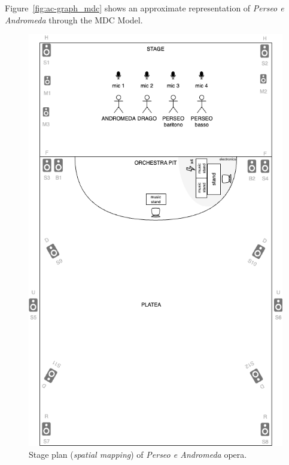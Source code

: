 Figure~\ref{fig:ac-graph_mdc} shows an approximate representation of \textit{Perseo e Andromeda} through the MDC Model.


\begin{figure}
    \centering
    \includegraphics[width=\linewidth]{chapters/appendix/c/image/graphc-mapping-spatial.png}
    \caption{Stage plan (\textit{spatial mapping}) of \textit{Perseo e Andromeda} opera.}
    \label{fig:ac-mapping-spatial}
\end{figure}